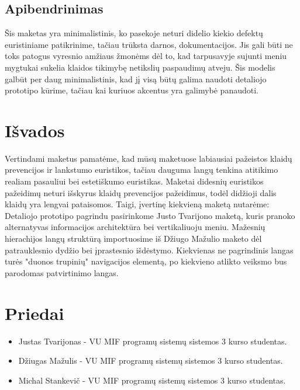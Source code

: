 \documentclass[oneside]{VUMIFPSkursinis}
\begin{document}
\subsection{Apibendrinimas}
Šis maketas yra minimalistinis, ko pasekoje neturi didelio kiekio defektų euristiniame patikrinime, tačiau trūksta darnos, dokumentacijos. Jis gali būti ne toks patogus vyresnio amžiaus žmonėms dėl to, kad tarpusavyje sujunti meniu mygtukai sukelia klaidos tikimybę netikslių paspaudimų atveju. Šis modelis galbūt per daug minimalistinis, kad jį visą būtų galima naudoti detaliojo prototipo kūrime, tačiau kai kuriuos akcentus yra galimybė panaudoti.
\section{Išvados}
Vertindami maketus pamatėme, kad mūsų maketuose labiausiai pažeistos klaidų prevencijos ir lankstumo euristikos, tačiau dauguma langų tenkina atitikimo realiam pasauliui bei estetiškumo euristikas. Maketai didesnių euristikos pažeidimų neturi išskyrus klaidų prevencijos pažeidimus, todėl didžioji dalis klaidų yra lengvai pataisomos. Taigi, įvertinę kiekvieną maketą nutarėme: \\
Detaliojo prototipo pagrindu pasirinkome Justo Tvarijono maketą, kuris pranoko alternatyvas informacijos architektūra bei vertikaliuoju meniu. Mažesnių hierachijos langų struktūrą importuosime iš Džiugo Mažulio maketo dėl patrauklesnio dydžio bei įprastesnio išdėstymo.  Kiekvienas ne pagrindinis langas turės "duonos trupinių" navigacijos elementą, po kiekvieno atlikto veiksmo bus parodomas patvirtinimo langas.
\section{Priedai}
	\begin{itemize}
		\item Justas Tvarijonas - VU MIF programų sistemų sistemos 3 kurso studentas.
		\item Džiugas Mažulis - VU MIF programų sistemų sistemos 3 kurso studentas.
		\item Michal Stankevič - VU MIF programų sistemų sistemos 3 kurso studentas.
	\end{itemize}
\end{document}
